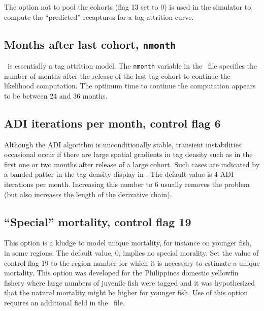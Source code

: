 The option not to pool the cohorts (flag 13 set to 0) is used in the
simulator to compute the ``predicted'' recaptures for a tag attrition
curve.

\subsection*{Months after last cohort, {\tt nmonth}}
\TE\ is essentially a tag attrition model. The {\tt nmonth} variable
in the \PAR\ file specifies the number of months after the release of
the last tag cohort to continue the likelihood computation. The
optimum time to continue the computation appears to be between 24 and
36 months.

\subsection*{ADI iterations per month, control flag 6}
Although the ADI algorithm is unconditionally stable, transient
instabilities occasional occur if there are large spatial gradients in
tag density such as in the first one or two months after release of a
large cohort. Such cases are indicated by a banded patter in the tag
density display in \TM. The default value is 4 ADI iterations per
month. Increasing this number to 6 usually removes the problem (but
also increases the length of the derivative chain).

\subsection*{``Special'' mortality, control flag 19}
This option is a kludge to model unique mortality, for instance on
younger fish, in some regions. The default value, 0, implies no
special morality. Set the value of control flag 19 to the region
number for which it is necessary to estimate a unique mortality. This
option was developed for the Philippines domestic yellowfin fishery
where large numbers of juvenile fish were tagged and it was
hypothesized 
that the natural mortality might be higher for younger fish.
Use of this option requires an additional field in the \PAR\ file.

